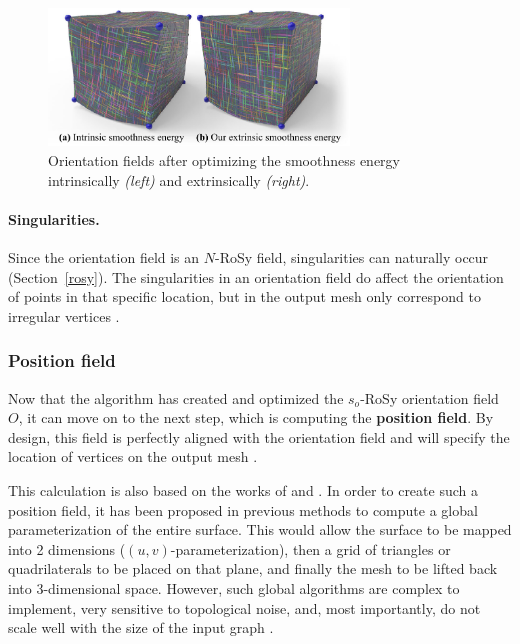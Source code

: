 \documentclass{ACGSeminar}
\begin{document}
\begin{figure}[htb!]
	\begin{centering}
		\includegraphics[width=8cm]{img/orientation-field-illustration.png}\par
	\end{centering}
	\caption{Orientation fields after optimizing the smoothness energy intrinsically \textit{(left)} and extrinsically \textit{(right)}. \cite{jakob2015instant}}
	\label{fig:orientation-field-illustration}
\end{figure}

\paragraph{Singularities.}
Since the orientation field is an $N$-RoSy field, singularities can naturally occur (Section~\ref{rosy}). The singularities in an orientation field do affect the orientation of points in that specific location, but in the output mesh only correspond to irregular vertices \cite{jakob2015instant}.

\subsubsection{Position field}
Now that the algorithm has created and optimized the $s_o$-RoSy orientation field $O$, it can move on to the next step, which is computing the \textbf{position field}. By design, this field is perfectly aligned with the orientation field and will specify the location of vertices on the output mesh \cite{jakob2015instant}.\bigskip

This calculation is also based on the works of \cite{bommes2009mixed} and \cite{ray2006periodic}. In order to create such a position field, it has been proposed in previous methods to compute a global parameterization of the entire surface. This would allow the surface to be mapped into 2 dimensions ($(u,v)$-parameterization), then a grid of triangles or quadrilaterals to be placed on that plane, and finally the mesh to be lifted back into 3-dimensional space. However, such global algorithms are complex to implement, very sensitive to topological noise, and, most importantly, do not scale well with the size of the input graph \cite{jakob2015instant}.\bigskip
\end{document}
